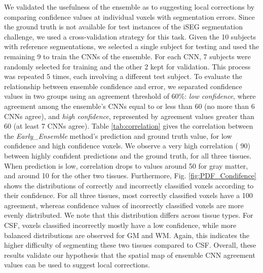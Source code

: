 \documentclass[twoside,espcrc2]{elsarticle}
\begin{document}
We validated the usefulness of the ensemble as to suggesting local corrections by comparing confidence values at individual voxels with segmentation errors. Since the ground truth is not available for test instances of the iSEG segmentation challenge, we used a cross-validation strategy for this task. Given the 10 subjects with reference segmentations, we selected a single subject for testing and used the remaining 9 to train the  CNNs of the ensemble. For each CNN, 7 subjects were randomly selected for training and the other 2 kept for validation. This process was repeated 5 times, each involving a different test subject. To evaluate the relationship between ensemble confidence and error, we separated confidence values in two groups using an agreement threshold of 60\%:  \emph{low confidence}, where agreement among the ensemble's CNNs equal to or less than 60 (no more than 6 CNNs agree), and \emph{high confidence}, represented by agreement values greater than 60 (at least 7 CNNs agree).
Table \ref{tab:correlation} gives the correlation between the \textit{Early\_Ensemble} method's prediction and ground truth value, for low confidence and high confidence voxels. We observe a very high correlation ( 90) between highly confident predictions and the ground truth, for all three tissues. When prediction is low, correlation drops to values around 50 for gray matter, and around 10 for the other two tissues. Furthermore, Fig. \ref{fig:PDF_Condifence} shows the distributions of correctly and incorrectly classified voxels according to their confidence. For all three tissues, most correctly classified voxels have a 100 agreement, whereas confidence values of incorrectly classified voxels are more evenly distributed. We note that this distribution differs across tissue types. For CSF, voxels classified incorrectly mostly have a low confidence, while more balanced distributions are observed for GM and WM. Again, this indicates the higher difficulty of segmenting these two tissues compared to CSF. Overall, these results validate our hypothesis that the spatial map of ensemble CNN agreement values can be used to suggest local corrections. 
\end{document}
